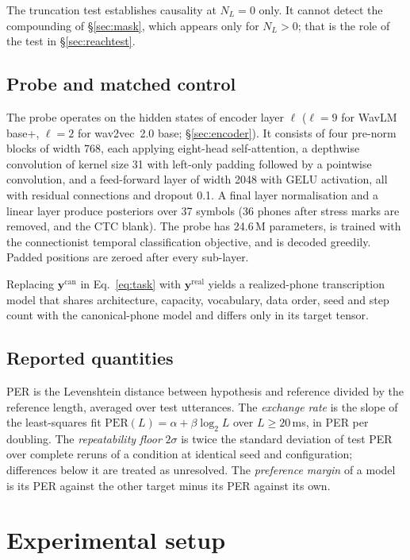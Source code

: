 \documentclass[journal]{IEEEtran}
\begin{document}
The truncation test establishes causality at $N_L=0$ only. It cannot detect
the compounding of \S\ref{sec:mask}, which appears only for $N_L>0$; that is
the role of the test in \S\ref{sec:reachtest}.

\subsection{Probe and matched control}
\label{sec:probe}

The probe operates on the hidden states of encoder layer $\ell$ ($\ell=9$ for
WavLM base+, $\ell=2$ for wav2vec~2.0 base; \S\ref{sec:encoder}). It consists
of four pre-norm blocks of width 768, each applying eight-head self-attention,
a depthwise convolution of kernel size 31 with left-only padding followed by a
pointwise convolution, and a feed-forward layer of width 2048 with GELU
activation, all with residual connections and dropout 0.1. A final layer
normalisation and a linear layer produce posteriors over 37 symbols (36 phones
after stress marks are removed, and the CTC blank). The probe has 24.6\,M
parameters, is trained with the connectionist temporal classification
objective, and is decoded greedily. Padded positions are zeroed after every
sub-layer.

Replacing $\mathbf{y}^{\mathrm{can}}$ in Eq.~\ref{eq:task} with
$\mathbf{y}^{\mathrm{real}}$ yields a realized-phone transcription model that
shares architecture, capacity, vocabulary, data order, seed and step count
with the canonical-phone model and differs only in its target tensor.

\subsection{Reported quantities}
\label{sec:quantities}

PER is the Levenshtein distance between hypothesis and reference divided by
the reference length, averaged over test utterances. The \emph{exchange rate}
is the slope of the least-squares fit
$\mathrm{PER}(L)=\alpha+\beta\log_2 L$ over $L\ge20$\,ms, in PER per doubling.
The \emph{repeatability floor} $2\sigma$ is twice the standard deviation of
test PER over complete reruns of a condition at identical seed and
configuration; differences below it are treated as unresolved. The
\emph{preference margin} of a model is its PER against the other target minus
its PER against its own.

\section{Experimental setup}
\label{sec:setup}
\end{document}
